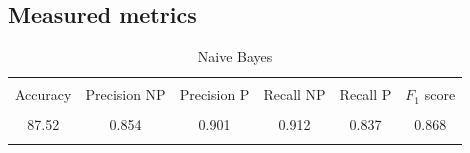 \documentclass[journal,twocolumn]{IEEEtran}
\begin{document}
\begin{appendices}

\section{Measured metrics}

\begin{table}[H]
\caption{Naive Bayes}
\centering
\begin{tabular}{cccccc}
\hline\\ [-1.5ex]
{Accuracy} & Precision NP & Precision P & Recall NP & Recall P & $F_1$ score \\ \hline\\ [-1.5ex]
87.52   &     0.854   &    0.901   &  0.912  &  0.837 & 0.868 \\ \hline\\ [-1.5ex]
\end{tabular}
\end{table}


\end{appendices}
\end{document}
